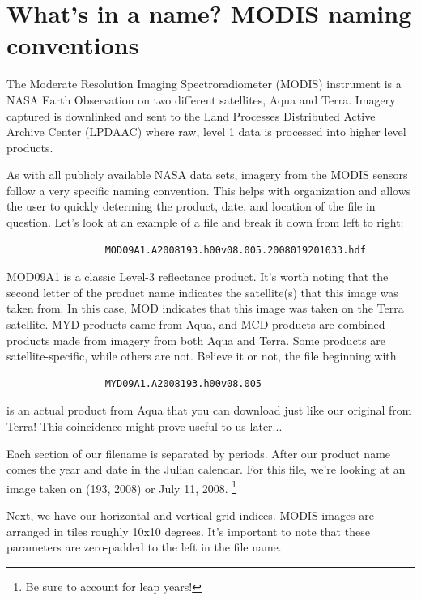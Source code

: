 \documentclass{book}
\theoremstyle{aside_style}
\begin{document}
\section{What's in a name? MODIS naming conventions}\label{MODISname}

The Moderate Resolution Imaging Spectroradiometer (MODIS) instrument is a NASA Earth Observation on two different satellites, Aqua and Terra.
Imagery captured is downlinked and sent to the Land Processes Distributed Active Archive Center (LPDAAC) where raw, level 1 data is processed 
into higher level products. 

As with all publicly available NASA data sets, imagery from the MODIS sensors follow a very specific naming convention. This helps with
organization and allows the user to quickly determing the product, date, and location of the file in question. Let's look at an example of a 
file and break it down from left to right:

\begin{lstlisting}
                 MOD09A1.A2008193.h00v08.005.2008019201033.hdf
\end{lstlisting}
\vskip-20pt
MOD09A1 is a classic Level-3 reflectance product. It's worth noting that the second letter of the product name indicates the satellite(s) that this
image was taken from. In this case, MOD indicates that this image was taken on the Terra satellite. MYD products came from Aqua, and MCD products
are combined products made from imagery from both Aqua and Terra. Some products are satellite-specific, while others are not. Believe it
or not, the file beginning with

\begin{lstlisting}
                 MYD09A1.A2008193.h00v08.005
\end{lstlisting}
\vskip-20pt
is an actual product from Aqua that you can download just like our original from Terra! This coincidence might prove useful to us later...

Each section of our filename is separated by periods. After our product name comes the year and date in the Julian calendar. For this file, we're looking
at an image taken on (193, 2008) or July 11, 2008. \footnote{Be sure to account for leap years!}

Next, we have our horizontal and vertical grid indices. MODIS images are arranged in tiles roughly 10x10 degrees. It's important to note that these
parameters are zero-padded to the left in the file name.
\end{document}
